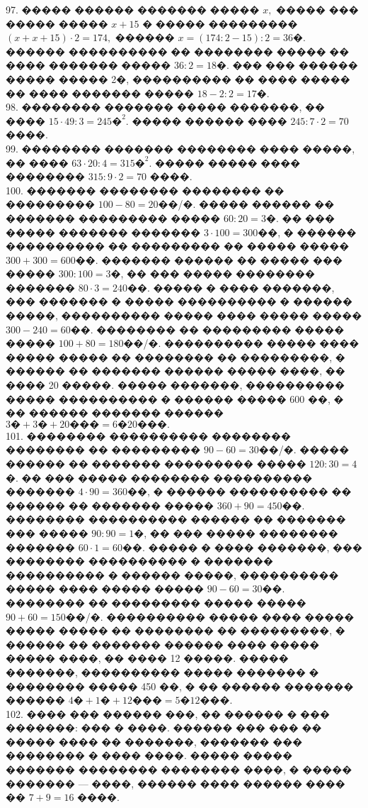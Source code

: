 \documentclass[12pt]{article}
\begin{document}
97. ����� ������ ������� ����� $x,$ ����� ��� ����� ����� $x+15$ � ����� ��������� $(x+x+15)\cdot2=174,$ ������ $x=(174:2-15):2=36\text{�}.$ ������ ���������� �� �������� ����� �� ���� ������� ����� $36:2=18\text{�}.$ ��� ��� ������ ����� ����� 2�, ���������� �� ���� ����� �� ���� ������� ����� $18-2:2=17\text{�}.$\\
98. �������� ������� ����� �������, �� ���� $15\cdot49:3=245\text{�}^2.$ ����� ������ ���� $245:7\cdot2=70$ ����.\\
99. �������� ������� �������� ���� �����, �� ���� $63\cdot20:4=315\text{�}^2.$ ����� ����� ���� �������� $315:9\cdot2=70$ ����.\\
100. ������� �������� �������� �� ��������� $100-80=20$��/�. ����� ������ �� ������� ��������� ����� $60:20=3$�. �� ��� ����� ������� ������� $3\cdot100=300$��, � ������ ���������� �� ��������� �� ����� ����� $300+300=600$��. ������� ������ �� ����� ��� ����� $300:100=3$�, �� ��� ����� �������� ������� $80\cdot3=240$��. ����� � ���� �������, ��� ������� � ����� ���������� � ������ �����, ���������� ����� ���� ����� ����� $300-240=60$��. �������� �� ��������� ����� ����� $100+80=180$��/�. ���������� ����� ���� ����� ����� �� �������� �� ���������, � ������ �� ������� ������ ����� ����, �� ���� 20 �����. ����� �������, ���������� ����� ���������� � ������ ����� 600 ��, � �� ������ ������� ������ $3\text{�}+3\text{�}+20\text{���}=6\text{�}20\text{���}.$\\
101. �������� ���������� �������� �������� �� ��������� $90-60=30$��/�. ����� ������ �� ������� ��������� ����� $120:30=4$�. �� ��� ����� �������� ���������� ������� $4\cdot90=360$��, � ������ ���������� �� ������ �� ������� ����� $360+90=450$��. �������� ���������� ������ �� ������� ��� ����� $90:90=1$�, �� ��� ����� �������� ������� $60\cdot1=60$��. ����� � ���� �������, ��� �������� ���������� � ������� ���������� � ������ �����, ���������� ����� ���� ����� ����� $90-60=30$��. �������� �� ��������� ����� ����� $90+60=150$��/�. ���������� ����� ���� ����� ����� ����� �� �������� �� ���������, � ������ �� ������� ������ ���� ����� ����� ����, �� ���� 12 �����. ����� �������, ���������� ����� ������� � �������� ����� 450 ��, � �� ������ ������� ������ $4\text{�}+1\text{�}+12\text{���}=5\text{�}12\text{���}.$\\
102. ���� ��� ������ ���, �� ������ � ��� �������: ��� � ����. ������ ��� ��� �� ����� ���� �� �������, ������� ��� �������� � ���� ����. ����� ����� ������� �������� �������� ����, � ����� ������� --- ����, ������ ���� ������ ���� �� $7+9=16$ ����.\\
\end{document}
